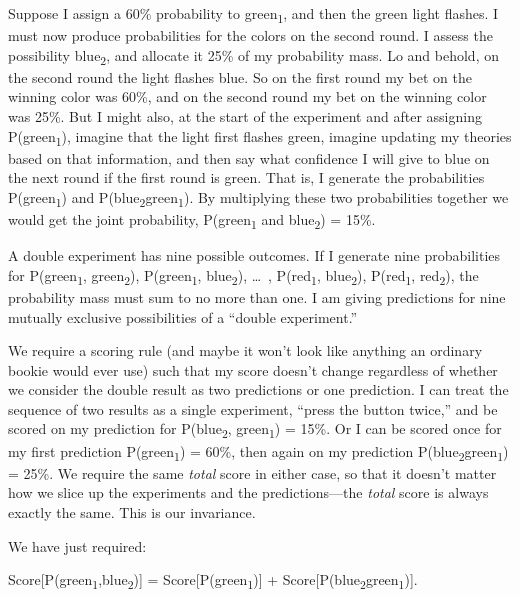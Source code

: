 {
 Suppose I assign a 60\% probability to green\textsubscript{1}, and
then the green light flashes. I must now produce probabilities for the
colors on the second round. I assess the possibility
blue\textsubscript{2}, and allocate it 25\% of my probability mass. Lo
and behold, on the second round the light flashes blue. So on the first
round my bet on the winning color was 60\%, and on the second round my
bet on the winning color was 25\%. But I might also, at the start of
the experiment and after assigning P(green\textsubscript{1}), imagine
that the light first flashes green, imagine updating my theories based
on that information, and then say what confidence I will give to blue
on the next round if the first round is green. That is, I generate the
probabilities P(green\textsubscript{1}) and
P(blue\textsubscript{2}{\textbar}green\textsubscript{1}). By
multiplying these two probabilities together we would get the joint
probability, P(green\textsubscript{1} and blue\textsubscript{2}) =
15\%.}

{
 A double experiment has nine possible outcomes. If I generate nine
probabilities for P(green\textsubscript{1}, green\textsubscript{2}),
P(green\textsubscript{1}, blue\textsubscript{2}), \ldots~,
P(red\textsubscript{1}, blue\textsubscript{2}), P(red\textsubscript{1},
red\textsubscript{2}), the probability mass must sum to no more than
one. I am giving predictions for nine mutually exclusive possibilities
of a ``double experiment.''}

{
 We require a scoring rule (and maybe it won't look
like anything an ordinary bookie would ever use) such that my score
doesn't change regardless of whether we consider the
double result as two predictions or one prediction. I can treat the
sequence of two results as a single experiment,
``press the button twice,'' and be
scored on my prediction for P(blue\textsubscript{2},
green\textsubscript{1}) = 15\%. Or I can be scored once for my first
prediction P(green\textsubscript{1}) = 60\%, then again on my
prediction P(blue\textsubscript{2}{\textbar}green\textsubscript{1}) =
25\%. We require the same \textit{total} score in either case, so that
it doesn't matter how we slice up the experiments and
the predictions---the \textit{total} score is always exactly the same.
This is our invariance.}

{
 We have just required:}

{\centering
 Score[P(green\textsubscript{1},blue\textsubscript{2})] =
Score[P(green\textsubscript{1})] +
Score[P(blue\textsubscript{2}{\textbar}green\textsubscript{1})].
\par}


